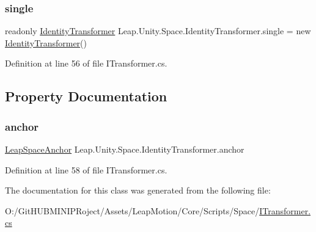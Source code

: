 \subsubsection{\texorpdfstring{single}{single}}
{\footnotesize\ttfamily readonly \mbox{\hyperlink{class_leap_1_1_unity_1_1_space_1_1_identity_transformer}{Identity\+Transformer}} Leap.\+Unity.\+Space.\+Identity\+Transformer.\+single = new \mbox{\hyperlink{class_leap_1_1_unity_1_1_space_1_1_identity_transformer}{Identity\+Transformer}}()\hspace{0.3cm}{\ttfamily [static]}}



Definition at line 56 of file I\+Transformer.\+cs.



\subsection{Property Documentation}
\mbox{\label{class_leap_1_1_unity_1_1_space_1_1_identity_transformer_a262c6ce350ad3ce0aa9090f0360508fe}} 
\subsubsection{\texorpdfstring{anchor}{anchor}}
{\footnotesize\ttfamily \mbox{\hyperlink{class_leap_1_1_unity_1_1_space_1_1_leap_space_anchor}{Leap\+Space\+Anchor}} Leap.\+Unity.\+Space.\+Identity\+Transformer.\+anchor\hspace{0.3cm}{\ttfamily [get]}}



Definition at line 58 of file I\+Transformer.\+cs.



The documentation for this class was generated from the following file\+:\begin{DoxyCompactItemize}
\item 
O\+:/\+Git\+H\+U\+B\+M\+I\+N\+I\+P\+Roject/\+Assets/\+Leap\+Motion/\+Core/\+Scripts/\+Space/\mbox{\hyperlink{_i_transformer_8cs}{I\+Transformer.\+cs}}\end{DoxyCompactItemize}
